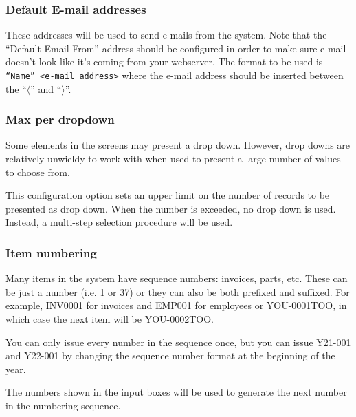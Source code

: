 \subsubsection{Default E-mail addresses}
\label{subsubsec-company-config-defaults-email}

These addresses will be used to send e-mails  from the system.
Note that the ``Default Email From'' address should be configured in order to make sure
e-mail doesn't look like it's coming from your webserver. The format to be used is \texttt{``Name'' <e-mail address>} where the e-mail address should be inserted between the
``$\langle$'' and ``$\rangle$''.

\subsubsection{Max per dropdown}
\label{subsubsec-company-config-defaults-max-dropdown}

Some elements in the screens may present a drop down. However, drop downs are
relatively unwieldy to work with when used to present a large number of values
to choose from.

This configuration option sets an upper limit on the number of records to be
presented as drop down.  When the number is exceeded, no drop down is used.  Instead,
a multi-step selection procedure will be used.

\subsubsection{Item numbering}
\label{subsubsec-company-config-defaults-item-numbers}

Many items in the system have sequence numbers: invoices, parts, etc.
These  can be just a number (i.e. 1 or 37) or
they can also be both prefixed and suffixed. For example, INV0001 for invoices and EMP001 for employees or YOU-0001TOO, in which case the next item will be YOU-0002TOO. 

You can only issue every number in the sequence once, but you can issue Y21-001 and Y22-001 by changing the sequence number format at the beginning of the year.

The numbers shown in the input boxes will be used to generate the next number in the
numbering sequence.

